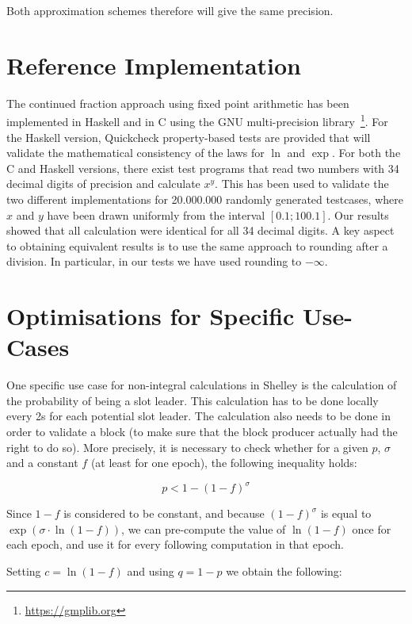 \documentclass[11pt,a4paper,dvipsnames]{article}
\theoremstyle{definition}
\theoremstyle{definition}
\begin{document}
Both approximation schemes therefore will give the same precision.

\section{Reference Implementation}
\label{sec:refer-impl}

The continued fraction approach using fixed point arithmetic has been
implemented in Haskell and in C using the GNU multi-precision
library~\footnote{\url{https://gmplib.org}}.
%
For the Haskell version, Quickcheck property-based tests are provided that will validate
the mathematical consistency of the laws for $\ln$ and $\exp$.
%
For both the C and Haskell versions, there exist test programs that read
two numbers with 34 decimal digits of precision and calculate
$x^{y}$. This has been used to validate the two different
implementations for 20.000.000 randomly generated testcases, where $x$ and $y$
have been drawn uniformly from the interval $[0.1; 100.1]$. Our results showed that all
calculation were identical for all 34 decimal digits.
A key aspect to obtaining equivalent results is to use the same approach to
rounding after a division. In particular, in our tests we have used rounding to $-\infty$.

\section{Optimisations for Specific Use-Cases}
\label{sec:optim-spec-use}

One specific use case for non-integral calculations in Shelley is the calculation of the
probability of being a slot leader. This calculation has to be done locally every 2s
for each potential slot leader. The calculation also needs to be done in order to
validate a block (to make sure that the block producer actually had the right to
do so).
%
More precisely, it is necessary to check whether for a given $p$, $\sigma$ and a
constant $f$ (at least for one epoch), the following inequality holds:

\begin{equation*}
  p < 1 - {(1 - f)}^{\sigma}
\end{equation*}

Since $1-f$ is considered to be constant, and because ${(1-f)}^{\sigma}$ is equal
to $\exp(\sigma\cdot\ln(1-f))$, we can pre-compute the value of $\ln(1-f)$ once for
each epoch, and use it for every following computation in that epoch.

Setting $c= \ln(1 - f)$ and using $q = 1 - p$ we obtain the following:
\end{document}
